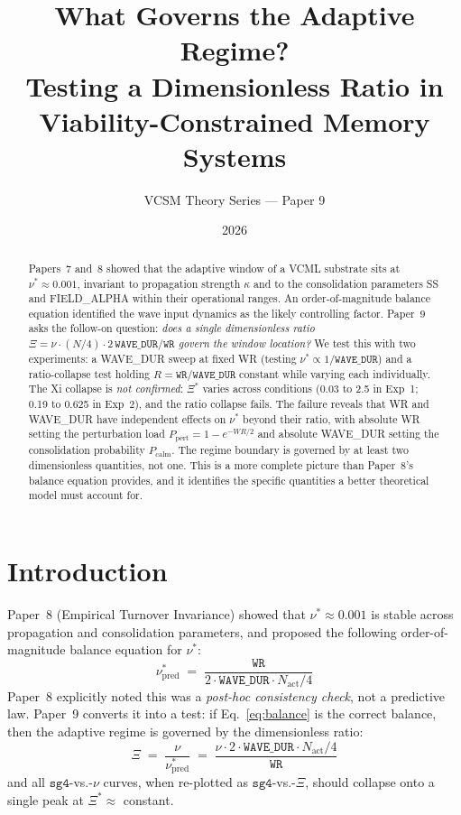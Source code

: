\documentclass[11pt]{article}
\title{What Governs the Adaptive Regime?\\
       Testing a Dimensionless Ratio in Viability-Constrained Memory Systems}
\author{VCSM Theory Series --- Paper 9}
\date{2026}
\theoremstyle{remark}
\begin{document}
\maketitle

\begin{abstract}
Papers~7 and~8 showed that the adaptive window of a VCML substrate sits at
$\nu^* \approx 0.001$, invariant to propagation strength $\kappa$ and to the
consolidation parameters SS and FIELD\_ALPHA within their operational ranges.
An order-of-magnitude balance equation identified the wave input dynamics as the
likely controlling factor. Paper~9 asks the follow-on question:
\emph{does a single dimensionless ratio $\Xi = \nu \cdot (N/4) \cdot
2\,\mathtt{WAVE\_DUR}/\mathtt{WR}$ govern the window location?} We test this
with two experiments: a WAVE\_DUR sweep at fixed WR (testing $\nu^* \propto
1/\mathtt{WAVE\_DUR}$) and a ratio-collapse test holding $R = \mathtt{WR}/
\mathtt{WAVE\_DUR}$ constant while varying each individually. The Xi collapse is
\emph{not confirmed}: $\Xi^*$ varies across conditions (0.03 to 2.5 in Exp~1;
0.19 to 0.625 in Exp~2), and the ratio collapse fails. The failure reveals that
WR and WAVE\_DUR have independent effects on $\nu^*$ beyond their ratio, with
absolute WR setting the perturbation load $P_{\text{pert}} = 1 - e^{-WR/2}$
and absolute WAVE\_DUR setting the consolidation probability $P_{\text{calm}}$.
The regime boundary is governed by at least two dimensionless quantities, not
one. This is a more complete picture than Paper~8's balance equation provides,
and it identifies the specific quantities a better theoretical model must account for.
\end{abstract}

\section{Introduction}

Paper~8 (Empirical Turnover Invariance) showed that $\nu^* \approx 0.001$ is
stable across propagation and consolidation parameters, and proposed the following
order-of-magnitude balance equation for $\nu^*$:
\begin{equation}
  \nu^*_{\text{pred}} \;=\; \frac{\mathtt{WR}}{2 \cdot \mathtt{WAVE\_DUR}
    \cdot N_{\text{act}}/4}
  \label{eq:balance}
\end{equation}
Paper~8 explicitly noted this was a \emph{post-hoc consistency check}, not a
predictive law. Paper~9 converts it into a test: if Eq.~\eqref{eq:balance}
is the correct balance, then the adaptive regime is governed by the
dimensionless ratio:
\begin{equation}
  \Xi \;=\; \frac{\nu}{\nu^*_{\text{pred}}} \;=\;
    \frac{\nu \cdot 2 \cdot \mathtt{WAVE\_DUR} \cdot N_{\text{act}}/4}{\mathtt{WR}}
  \label{eq:xi}
\end{equation}
and all $\mathtt{sg4}$-vs.-$\nu$ curves, when re-plotted as $\mathtt{sg4}$-vs.-$\Xi$,
should collapse onto a single peak at $\Xi^* \approx$ constant.
\end{document}
